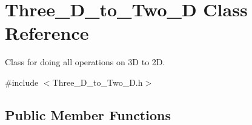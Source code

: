 \hypertarget{class_three___d__to___two___d}{}\section{Three\+\_\+\+D\+\_\+to\+\_\+\+Two\+\_\+D Class Reference}
\label{class_three___d__to___two___d}


Class for doing all operations on 3D to 2D.  




{\ttfamily \#include $<$Three\+\_\+\+D\+\_\+to\+\_\+\+Two\+\_\+\+D.\+h$>$}

\subsection*{Public Member Functions}
